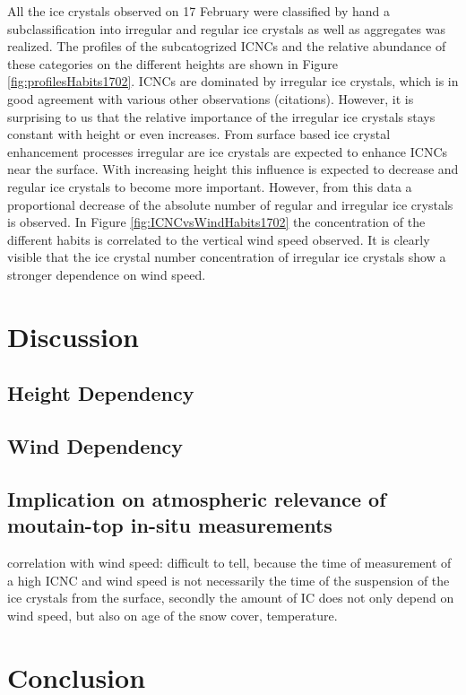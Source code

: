 \documentclass[draft,linenumbers]{agujournal}
\begin{document}
{All the ice crystals observed on 17 February were classified by hand a subclassification into irregular and regular ice crystals as well as aggregates was realized. The profiles of the subcatogrized ICNCs and the relative abundance of these categories on the different heights are shown in Figure \ref{fig:profilesHabits1702}. ICNCs are dominated by irregular ice crystals, which is in good agreement with various other observations (citations). However, it is surprising to us that the relative importance of the irregular ice crystals stays constant with height or even increases. From surface based ice crystal enhancement processes irregular are ice crystals are expected to enhance ICNCs near the surface. With increasing height this influence is expected to decrease and regular ice crystals to become more important. However, from this data a proportional decrease of the absolute number of regular and irregular ice crystals is observed. In Figure \ref{fig:ICNCvsWindHabits1702} the concentration of the different habits is correlated to the vertical wind speed observed. It is clearly visible that the ice crystal number concentration of irregular ice crystals show a stronger dependence on wind speed. 

\section{Discussion}
\label{Discussion}

\subsection{Height Dependency}
\subsection{Wind Dependency}
\subsection{Implication on atmospheric relevance of moutain-top in-situ measurements}

correlation with wind speed: difficult to tell, because the time of measurement of a high ICNC and wind speed is not necessarily the time of the suspension of the ice crystals from the surface, secondly the amount of IC does not only depend on wind speed, but also on age of the snow cover, temperature.

\section{Conclusion}
\label{Summary}



}
\end{document}
